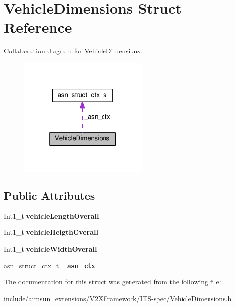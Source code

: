 \hypertarget{structVehicleDimensions}{}\section{Vehicle\+Dimensions Struct Reference}
\label{structVehicleDimensions}


Collaboration diagram for Vehicle\+Dimensions\+:\nopagebreak
\begin{figure}[H]
\begin{center}
\leavevmode
\includegraphics[width=181pt]{structVehicleDimensions__coll__graph}
\end{center}
\end{figure}
\subsection*{Public Attributes}
\begin{DoxyCompactItemize}
\item 
Int1\+\_\+t {\bfseries vehicle\+Length\+Overall}\hypertarget{structVehicleDimensions_acc407e77bdad57fcde4b911aa20c8b42}{}\label{structVehicleDimensions_acc407e77bdad57fcde4b911aa20c8b42}

\item 
Int1\+\_\+t {\bfseries vehicle\+Heigth\+Overall}\hypertarget{structVehicleDimensions_ac6440ae720a7c14c098a6a4873e50f88}{}\label{structVehicleDimensions_ac6440ae720a7c14c098a6a4873e50f88}

\item 
Int1\+\_\+t {\bfseries vehicle\+Width\+Overall}\hypertarget{structVehicleDimensions_a1b4ef780687f2b7081b1f473d80caca3}{}\label{structVehicleDimensions_a1b4ef780687f2b7081b1f473d80caca3}

\item 
\hyperlink{structasn__struct__ctx__s}{asn\+\_\+struct\+\_\+ctx\+\_\+t} {\bfseries \+\_\+asn\+\_\+ctx}\hypertarget{structVehicleDimensions_ada0305db5e8db07e9577fc634382abb8}{}\label{structVehicleDimensions_ada0305db5e8db07e9577fc634382abb8}

\end{DoxyCompactItemize}


The documentation for this struct was generated from the following file\+:\begin{DoxyCompactItemize}
\item 
include/aimsun\+\_\+extensions/\+V2\+X\+Framework/\+I\+T\+S-\/spec/Vehicle\+Dimensions.\+h\end{DoxyCompactItemize}
